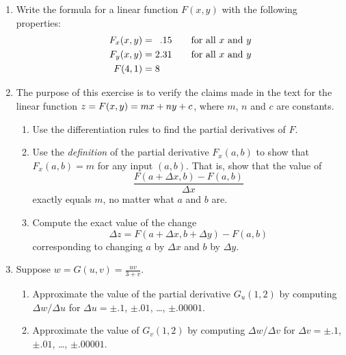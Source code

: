 \begin{enumerate}
\begin{enumerate}
  \item Suppose a mole of gas at 350 degrees Kelvin is under a pressure
of 20 newtons per square meter.  If the temperature of the gas
increases by 10 degrees Kelvin and the volume increases by 1 cubic
meter, will the pressure increase or decrease?  By about how much?


\end{enumerate}
\item Write the formula for a linear function $F(x, y)$ with the
following properties:
\begin{align*}
	F_x(x, y) &= \hphantom{2}.15 \qquad 
		\mbox{for all $x$ and $y$} \\
	F_y(x, y) &= 2.31 \qquad 
		\mbox{for all $x$ and $y$}  \\ 
	F(4, 1)   &= 8
\end{align*}


\item The purpose of this exercise is to verify the claims made in the
text for the linear function $z=F(x,y) = mx + ny + c\/$, where $m$,
$n$ and $c$ are constants.

  \begin{enumerate}
  \item Use the differentiation rules to find the partial derivatives of
$F$.

  \item Use the {\em definition\/} of the partial derivative $F_x(a,b)$
to show that $F_x(a,b)= m$ for any input $(a,b)$.  That is, show that
the value of
\[
\frac{F(a+\Delta x, b) - F(a,b)}{\Delta x}
\]
exactly equals $m$, no matter what $a$ and $b$ are.

  \item Compute the exact value of the change
\[
\Delta z = F(a+\Delta x,b+\Delta y) - F(a,b)
\]
corresponding to changing $a$ by $\Delta x$ and $b$ by $\Delta y$.


\end{enumerate}
\item Suppose $w=G(u,v) = {\displaystyle \frac{uv}{3+v}}$.

  \begin{enumerate}
  \item Approximate the value of the partial derivative $G_u(1,2)$ by
computing $\Delta w/\Delta u$ for $\Delta u = \pm .1$, $\pm .01$,
\ldots, $\pm .00001$.

  \item Approximate the value of $G_v(1,2)$ by computing $\Delta w/\Delta
v$ for $\Delta v = \pm .1$, $\pm .01$, \ldots, $\pm .00001$.


\end{enumerate}
\end{enumerate}

